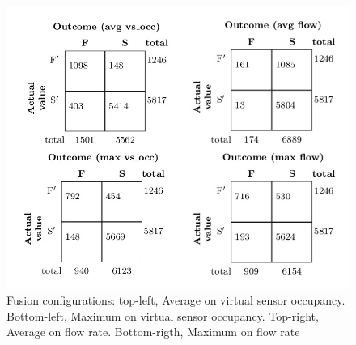 \begin{figure}[htb!]
\centering
\includegraphics[scale=0.4]{fig/4/conf_mat.jpeg}
\caption{Fusion configurations: top-left, Average on virtual sensor occupancy. Bottom-left, Maximum on virtual sensor occupancy. Top-right, Average on flow rate. Bottom-rigth, Maximum on flow rate}
\label{vl_cf}
\end{figure}

